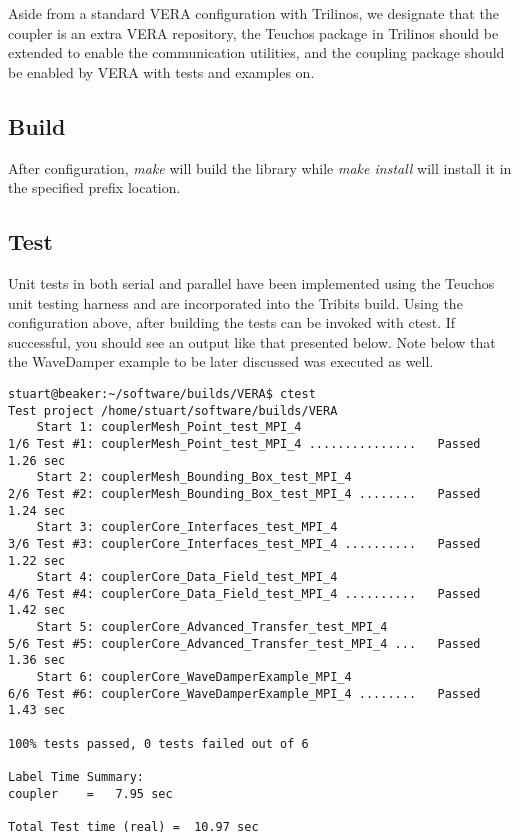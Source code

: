 \documentclass[letterpaper]{article}
\begin{document}
Aside from a standard VERA configuration with Trilinos, we designate
that the coupler is an extra VERA repository, the Teuchos package in
Trilinos should be extended to enable the communication utilities, and
the coupling package should be enabled by VERA with tests and examples
on.

\subsection{Build}

After configuration, {\sl make} will build the library while {\sl make
  install} will install it in the specified prefix location.

\subsection{Test}
Unit tests in both serial and parallel have been implemented using the
Teuchos unit testing harness and are incorporated into the Tribits
build. Using the configuration above, after building the tests can be
invoked with ctest. If successful, you should see an output like that
presented below. Note below that the WaveDamper example to be later
discussed was executed as well.

\begin{verbatim}
stuart@beaker:~/software/builds/VERA$ ctest
Test project /home/stuart/software/builds/VERA
    Start 1: couplerMesh_Point_test_MPI_4
1/6 Test #1: couplerMesh_Point_test_MPI_4 ...............   Passed    1.26 sec
    Start 2: couplerMesh_Bounding_Box_test_MPI_4
2/6 Test #2: couplerMesh_Bounding_Box_test_MPI_4 ........   Passed    1.24 sec
    Start 3: couplerCore_Interfaces_test_MPI_4
3/6 Test #3: couplerCore_Interfaces_test_MPI_4 ..........   Passed    1.22 sec
    Start 4: couplerCore_Data_Field_test_MPI_4
4/6 Test #4: couplerCore_Data_Field_test_MPI_4 ..........   Passed    1.42 sec
    Start 5: couplerCore_Advanced_Transfer_test_MPI_4
5/6 Test #5: couplerCore_Advanced_Transfer_test_MPI_4 ...   Passed    1.36 sec
    Start 6: couplerCore_WaveDamperExample_MPI_4
6/6 Test #6: couplerCore_WaveDamperExample_MPI_4 ........   Passed    1.43 sec

100% tests passed, 0 tests failed out of 6

Label Time Summary:
coupler    =   7.95 sec

Total Test time (real) =  10.97 sec
\end{verbatim}
\end{document}
